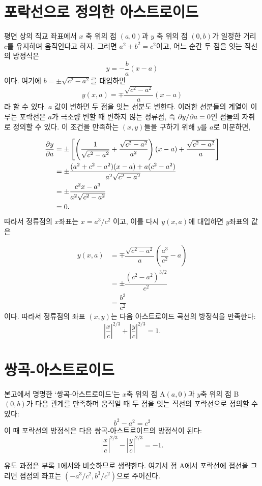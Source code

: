 \documentclass[twocolumn]{article}
\begin{document}
\section{포락선으로 정의한 아스트로이드} \label{app:astroid}
평면 상의 직교 좌표에서 $x$ 축 위의 점  $(a, 0)$과 $y$ 축 위의 점 $(0, b)$가 일정한 거리 $c$를 유지하며 움직인다고 하자. 그러면 $a^2+b^2=c^2$이고, 어느 순간 두 점을 잇는 직선의 방정식은 
$$y=-\dfrac{b}{a}(x-a)$$
이다. 여기에 
$b=\pm \sqrt{c^2-a^2}$를 대입하면 
$$y(x, a) = \mp \dfrac{\sqrt{c^2-a^2}}{a}(x-a)$$
라 할 수 있다. 
$a$ 값이 변하면 두 점을 잇는 선분도 변한다. 이러한 선분들의 계열이 이루는 포락선은 $a$가 극소량 변할 때 변하지 않는 정류점, 즉
${{\partial y}/{\partial a}} = 0$인 점들의 자취로 정의할 수 있다. 이 조건을 만족하는 $(x, y)$들을 구하기 위해 $y$를 $a$로 미분하면,

$$ \begin{aligned}
{\frac{\partial y}{\partial a}} &= \pm\left[\left( \dfrac{1}{\sqrt{c^2-a^2}}+\dfrac{\sqrt{c^2-a^2}}{a^2}\right) (x-a) + \dfrac{\sqrt{c^2-a^2}}{a} \right]\\
	&= \pm \dfrac{(a^2+c^2-a^2)(x-a)+a(c^2-a^2)}{a^2\sqrt{c^2-a^2}}\\
	&= \pm \dfrac{c^2 x - a^3}{a^2 \sqrt{c^2 - a^2}}\\
	&= 0.
\end{aligned}
$$
따라서 정류점의 $x$좌표는 $x = a^3/c^2$ 이고, 이를 다시 $y(x, a)$에 대입하면 $y$좌표의 값은

$$ \begin{aligned}
y(x, a) &= \mp \dfrac{\sqrt{c^2-a^2}}{a}\left(\dfrac{a^3}{c^2}-a\right)\\
	& = \pm \dfrac{\left( c^2- a^2 \right)^{3/2}}{c^2}\\
	& = \dfrac{b^3}{c^2}
\end{aligned}
$$
이다. 따라서 정류점의 좌표 $(x, y)$는 다음 아스트로이드 곡선의 방정식을 만족한다:
$$ \left|\dfrac{x}{c}\right|^{2/3} + \left|\dfrac{y}{c}\right|^{2/3} = 1. $$

\section{쌍곡-아스트로이드}\label{app:hyperastroid}
본고에서 명명한 `쌍곡-아스트로이드'는 $x$축 위의 점 A$(a, 0)$과 $y$축 위의 점 B$(0, b)$가 다음 관계를 만족하며 움직일 때 두 점을 잇는 직선의 포락선으로 정의할 수 있다:
$$b^2-a^2=c^2$$
이 때 포락선의 방정식은 다음 쌍곡-아스트로이드의 방정식이 된다:
$$ \left|\dfrac{x}{c}\right|^{2/3} - \left|\dfrac{y}{c}\right|^{2/3} = -1. $$

유도 과정은 부록 \ref{app:astroid}에서와 비슷하므로 생략한다.
여기서 점 A에서 포락선에 접선을 그리면 접점의 좌표는 $(-a^3/c^2, b^3/c^2)$으로 주어진다.
\end{document}
